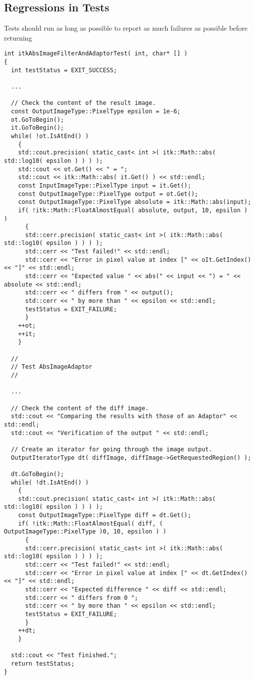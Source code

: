 \subsection{Regressions in Tests}
\label{subsec:RegressionsInTests}

Tests should run as long as possible to report as much failures as possible before returning

\small
\begin{verbatim}
int itkAbsImageFilterAndAdaptorTest( int, char* [] )
{
  int testStatus = EXIT_SUCCESS;

  ...

  // Check the content of the result image.
  const OutputImageType::PixelType epsilon = 1e-6;
  ot.GoToBegin();
  it.GoToBegin();
  while( !ot.IsAtEnd() )
    {
    std::cout.precision( static_cast< int >( itk::Math::abs( std::log10( epsilon ) ) ) );
    std::cout << ot.Get() << " = ";
    std::cout << itk::Math::abs( it.Get() ) << std::endl;
    const InputImageType::PixelType input = it.Get();
    const OutputImageType::PixelType output = ot.Get();
    const OutputImageType::PixelType absolute = itk::Math::abs(input);
    if( !itk::Math::FloatAlmostEqual( absolute, output, 10, epsilon ) )
      {
      std::cerr.precision( static_cast< int >( itk::Math::abs( std::log10( epsilon ) ) ) );
      std::cerr << "Test failed!" << std::endl;
      std::cerr << "Error in pixel value at index [" << oIt.GetIndex() << "]" << std::endl;
      std::cerr << "Expected value " << abs(" << input << ") = " << absolute << std::endl;
      std::cerr << " differs from " << output();
      std::cerr << " by more than " << epsilon << std::endl;
      testStatus = EXIT_FAILURE;
      }
    ++ot;
    ++it;
    }

  //
  // Test AbsImageAdaptor
  //

  ...

  // Check the content of the diff image.
  std::cout << "Comparing the results with those of an Adaptor" << std::endl;
  std::cout << "Verification of the output " << std::endl;

  // Create an iterator for going through the image output.
  OutputIteratorType dt( diffImage, diffImage->GetRequestedRegion() );

  dt.GoToBegin();
  while( !dt.IsAtEnd() )
    {
    std::cout.precision( static_cast< int >( itk::Math::abs( std::log10( epsilon ) ) ) );
    const OutputImageType::PixelType diff = dt.Get();
    if( !itk::Math::FloatAlmostEqual( diff, ( OutputImageType::PixelType )0, 10, epsilon ) )
      {
      std::cerr.precision( static_cast< int >( itk::Math::abs( std::log10( epsilon ) ) ) );
      std::cerr << "Test failed!" << std::endl;
      std::cerr << "Error in pixel value at index [" << dt.GetIndex() << "]" << std::endl;
      std::cerr << "Expected difference " << diff << std::endl;
      std::cerr << " differs from 0 ";
      std::cerr << " by more than " << epsilon << std::endl;
      testStatus = EXIT_FAILURE;
      }
    ++dt;
    }

  std::cout << "Test finished.";
  return testStatus;
}
\end{verbatim}
\normalsize

